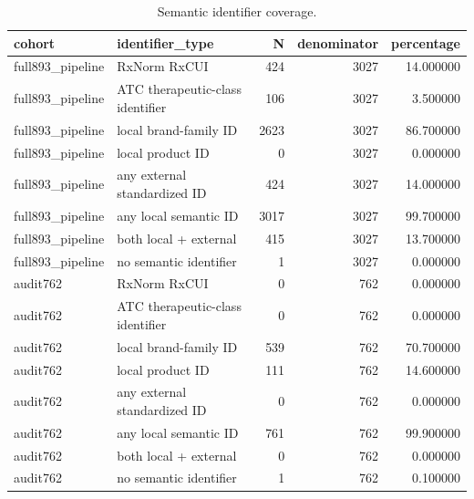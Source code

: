 \begin{table}
\caption{Semantic identifier coverage.}
\begin{tabular}{llrrr}
\toprule
cohort & identifier\_type & N & denominator & percentage \\
\midrule
full893\_pipeline & RxNorm RxCUI & 424 & 3027 & 14.000000 \\
full893\_pipeline & ATC therapeutic-class identifier & 106 & 3027 & 3.500000 \\
full893\_pipeline & local brand-family ID & 2623 & 3027 & 86.700000 \\
full893\_pipeline & local product ID & 0 & 3027 & 0.000000 \\
full893\_pipeline & any external standardized ID & 424 & 3027 & 14.000000 \\
full893\_pipeline & any local semantic ID & 3017 & 3027 & 99.700000 \\
full893\_pipeline & both local + external & 415 & 3027 & 13.700000 \\
full893\_pipeline & no semantic identifier & 1 & 3027 & 0.000000 \\
audit762 & RxNorm RxCUI & 0 & 762 & 0.000000 \\
audit762 & ATC therapeutic-class identifier & 0 & 762 & 0.000000 \\
audit762 & local brand-family ID & 539 & 762 & 70.700000 \\
audit762 & local product ID & 111 & 762 & 14.600000 \\
audit762 & any external standardized ID & 0 & 762 & 0.000000 \\
audit762 & any local semantic ID & 761 & 762 & 99.900000 \\
audit762 & both local + external & 0 & 762 & 0.000000 \\
audit762 & no semantic identifier & 1 & 762 & 0.100000 \\
\bottomrule
\end{tabular}
\end{table}
